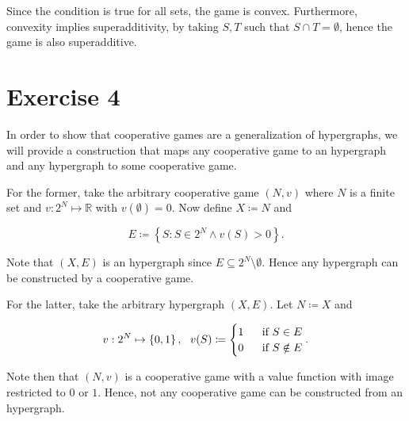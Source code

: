 \documentclass[american]{scrartcl}
\newcommand{\set}[1]{\left\{#1\right\}}
\begin{document}
Since the condition is true for all sets, the game is convex. Furthermore, convexity implies superadditivity, by taking $S, T$ such that $S \cap T = \emptyset$, hence the game is also superadditive.

\section*{Exercise 4}

In order to show that cooperative games are a generalization of hypergraphs, we will provide a construction that maps any cooperative game to an hypergraph and any hypergraph to some cooperative game.

For the former, take the arbitrary cooperative game $(N, v)$ where $N$ is a finite set and $v: 2^N \mapsto \mathbb{R}$ with $v(\emptyset) = 0$. Now define $X \coloneqq N$ and

\begin{equation}
    E \coloneqq \set{S: S \in 2^N \land v(S) > 0 }.
\end{equation}

Note that $(X, E)$ is an hypergraph since $E \subseteq 2^N \setminus \emptyset$. Hence any hypergraph can be constructed by a cooperative game.

For the latter, take the arbitrary hypergraph $(X, E)$. Let $N \coloneqq X$ and

\begin{equation}
    v: 2^N \mapsto \set{0, 1}, \ \
    v(S) \coloneqq \begin{cases}
        1 \  & \text{ if } S \in E    \\
        0 \  & \text{ if } S \notin E
    \end{cases}. \\
\end{equation}

Note then that $(N, v)$ is a cooperative game with a value function with image restricted to $0$ or $1$. Hence, not any cooperative game can be constructed from an hypergraph.
\end{document}
